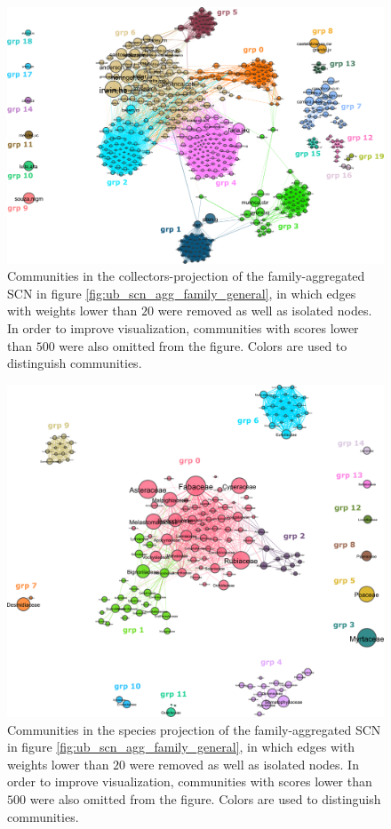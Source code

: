 \begin{figure}[!ht]
  	\centering
    \includegraphics[width=\linewidth]{figures/casestudy_ub/scn_family_projCol_communities.pdf}
    \caption{ Communities in the collectors-projection of the family-aggregated SCN in figure \ref{fig:ub_scn_agg_family_general}, in which edges with weights lower than $20$ were removed as well as isolated nodes. In order to improve visualization, communities with scores lower than $500$ were also omitted from the figure. Colors are used to distinguish communities.}
    \label{fig:ub_scn_family_projCol_communities}
\end{figure}

\begin{figure}[!ht]
  	\centering
    \includegraphics[width=\linewidth]{figures/casestudy_ub/scn_family_projSp_communities.pdf}
    \caption{ Communities in the species projection of the family-aggregated SCN in figure \ref{fig:ub_scn_agg_family_general}, in which edges with weights lower than $20$ were removed as well as isolated nodes. In order to improve visualization, communities with scores lower than $500$ were also omitted from the figure. Colors are used to distinguish communities.}
    \label{fig:ub_scn_family_projSp_communities}
\end{figure}


